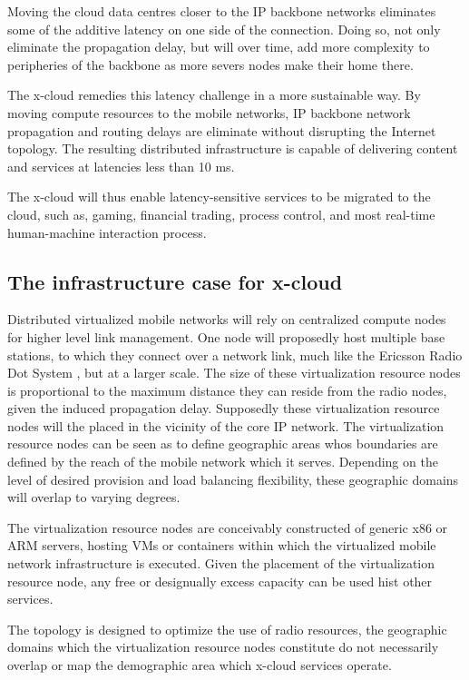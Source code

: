 \documentclass[conference]{IEEEtran}
\newcommand{\xcloud}{x-cloud }
\begin{document}
Moving the cloud data centres closer to the IP backbone networks eliminates some of the additive latency on one side of the connection. Doing so, not only eliminate the propagation delay, but will over time, add more complexity to peripheries of the backbone as more severs nodes make their home there. 

The \xcloud remedies this latency challenge in a more sustainable way. By moving compute resources to the mobile networks, IP backbone network propagation and routing delays are eliminate without disrupting the Internet topology. The resulting distributed infrastructure is capable of delivering content and services at latencies less than 10 ms. 

The \xcloud will thus enable latency-sensitive services to be migrated to the cloud, such as, gaming, financial trading, process control, and most real-time human-machine interaction process.

\subsection{The infrastructure case for \xcloud}
Distributed virtualized mobile networks will rely on centralized compute nodes for higher level link management. One node will proposedly host multiple base stations, to which they connect over a network link, much like the Ericsson Radio Dot System \cite{ericsson_dot}, but at a larger scale. The size of these virtualization resource nodes is proportional to the maximum distance they can reside from the radio nodes, given the induced propagation delay. Supposedly these virtualization resource nodes will the placed in the vicinity of the core IP network. The virtualization resource nodes can be seen as to define geographic areas whos boundaries are defined by the reach of the mobile network which it serves. Depending on the level of desired provision and load balancing flexibility, these geographic domains will overlap to varying degrees.

The virtualization resource nodes are conceivably constructed of generic x86 or ARM servers, hosting VMs or containers within which the virtualized mobile network infrastructure is executed. Given the placement of the virtualization resource node, any free or designually excess capacity can be used hist other services.

The topology is designed to optimize the use of radio resources, the geographic domains which the virtualization resource nodes constitute do not necessarily overlap or map the demographic area which \xcloud services operate.
\end{document}
